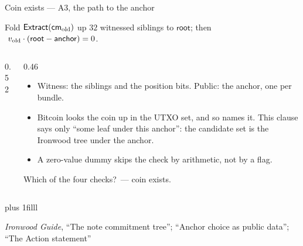 \documentclass[aspectratio=169,11pt]{beamer}
\newcommand{\cmsym}{\ensuremath{\mathsf{cm}}}
\newcommand{\Extract}{\ensuremath{\mathsf{Extract}}}
\newcommand{\src}[1]{\par\vskip0pt plus 1filll
  {\fontsize{6}{7.2}\selectfont\color{arbdim}\raggedright #1\par}}
\begin{document}
\begin{frame}{Coin exists --- A3, the path to the anchor}
\vspace{-4pt}
\begin{center}
Fold $\Extract(\Eold{\cmsym})$ up $32$ witnessed siblings to
$\mathsf{root}$; then
$\ v_{\mathrm{old}} \cdot (\mathsf{root} - \mathsf{anchor}) = 0$.
\end{center}
\vspace{-4pt}
\begin{columns}[T]
\begin{column}{0.52\textwidth}
\centering\ActionBox[anchor]
\end{column}
\begin{column}{0.46\textwidth}
\begin{itemize}\small
  \item Witness: the siblings and the position bits. Public: the
    anchor, one per bundle.
  \item Bitcoin looks the coin up in the UTXO set, and so names it.
    This clause says only ``some leaf under this anchor'': the
    candidate set is the Ironwood tree under the anchor.
  \item A zero-value dummy skips the check by arithmetic, not by a
    flag.
\end{itemize}
\smallskip
\alert{Which of the four checks?}\pause\ --- coin exists.
\end{column}
\end{columns}
\src{\emph{Ironwood Guide}, ``The note commitment tree'';
``Anchor choice as public data''; ``The Action statement''}
\end{frame}
\end{document}
